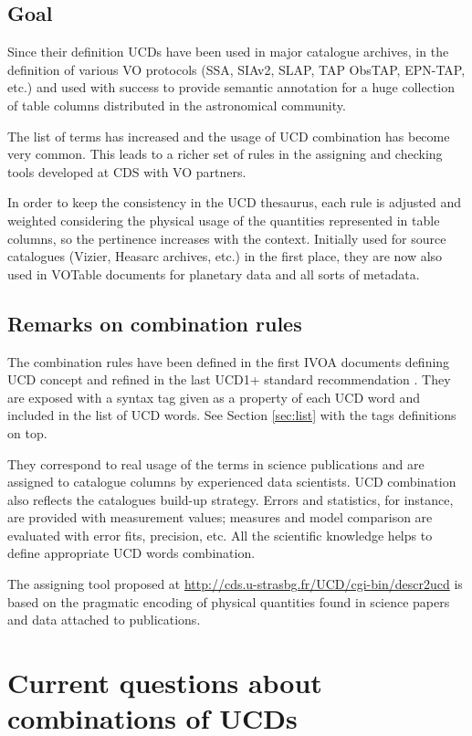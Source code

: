 \documentclass[11pt,a4paper]{ivoa}
\begin{document}
\subsection{Goal}
Since their definition UCDs have been used in major catalogue archives, in the definition of various
VO protocols (SSA, SIAv2, SLAP, TAP ObsTAP, EPN-TAP, etc.) and used with success to provide semantic
annotation for a huge collection of table columns distributed in the astronomical community.

The list of terms has increased and the usage of UCD combination has become very common. This leads
to a richer set of rules in the assigning and checking tools developed at CDS with VO partners.

In order to keep the consistency in the UCD thesaurus, each rule is adjusted and weighted considering 
the physical usage of the quantities represented in table columns, so the pertinence increases with 
the context. Initially used for source catalogues (Vizier, Heasarc archives, etc.) in the first place, 
they are now also used in VOTable documents for planetary data \citep{2022ivoa.spec.0822E} and all sorts of metadata.

\subsection{Remarks on combination rules}
The combination rules have been defined in the first IVOA documents defining UCD concept
\citep{2005ivoa.spec.0819D} and refined in the last UCD1+ standard recommendation \citep{2018ivoa.spec.0527P}. 
They are exposed with a syntax tag given as a property of each UCD word 
and included in the list of UCD words. See Section \ref{sec:list} with the tags definitions on top.

They correspond to real usage of the terms in science publications and are
assigned to catalogue columns by experienced data scientists.
UCD combination also reflects the catalogues 
build-up strategy. Errors and statistics, for instance, are provided with measurement values; measures 
and model comparison are evaluated with error fits, precision, etc. All the scientific knowledge helps 
to define appropriate UCD words combination.

The assigning tool proposed at \url{http://cds.u-strasbg.fr/UCD/cgi-bin/descr2ucd} is based on the
pragmatic encoding of physical quantities found in science papers and data attached to publications.

\section{Current questions about combinations of UCDs}
\end{document}
